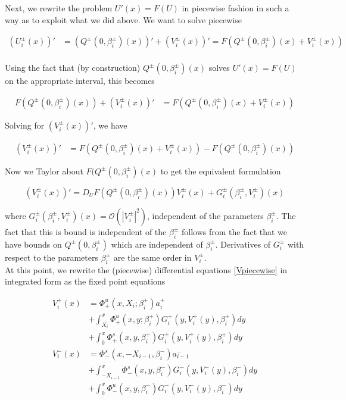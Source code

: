 \documentclass[12pt]{article}
\begin{document}
Next, we rewrite the problem $U'(x) = F(U)$ in piecewise fashion in such a way as to exploit what we did above. We want to solve piecewise

\begin{align*}
(U_i^\pm(x))' &= (Q^\pm(0, \beta_i^\pm)(x))' + (V_i^\pm(x))' = F\left(Q^\pm(0, \beta_i^\pm)(x) + V_i^\pm(x) \right) \\
\end{align*}

Using the fact that (by construction) $Q^\pm(0, \beta_i^\pm)(x)$ solves $U'(x) = F(U)$ on the appropriate interval, this becomes

\begin{align*}
F(Q^\pm(0, \beta_i^\pm)(x)) + (V_i^\pm(x))' &= F(Q^\pm(0, \beta_i^\pm)(x) + V_i^\pm(x) )
\end{align*}

Solving for $(V_i^\pm(x))'$, we have

\begin{align*}
(V_i^\pm(x))' &= F(Q^\pm(0, \beta_i^\pm)(x) + V_i^\pm(x) ) - F(Q^\pm(0, \beta_i^\pm)(x) )
\end{align*}

Now we Taylor about $F(Q^\pm(0, \beta_i^\pm)(x)$ to get the equivalent formulation

\begin{equation}\label{Vpiecewise}
(V_i^\pm(x))' = D_U F(Q^\pm(0, \beta_i^\pm)(x)) V_i^\pm(x)  + G_i^\pm(\beta_i^\pm, V_i^\pm)(x)
\end{equation}

where $G_i^\pm(\beta_i^\pm, V_i^\pm)(x) = \mathcal{O}(|V_i^\pm|^2)$, independent of the parameters $\beta_i^\pm$. The fact that this is bound is independent of the $\beta_i^\pm$ follows from the fact that we have bounds on $Q^\pm(0, \beta_i^\pm)$ which are independent of $\beta_i^\pm$. Derivatives of $G_i^\pm$ with respect to the parameters $\beta_i^\pm$ are the same order in $V_i^\pm$.\\

At this point, we rewrite the (piecewise) differential equations \eqref{Vpiecewise} in integrated form as the fixed point equations

\begin{align*}
V_i^+(x) &= \Phi^u_+(x, X_i; \beta_i^+) a_i^+  \\
&+ \int_{X_i}^x \Phi_+^u(x, y; \beta_i^+) G_i^+(y, V_i^+(y),\beta_i^+)dy \\
&+ \int_0^x \Phi_+^s(x, y, \beta_i^+) G_i^+(y, V_i^+(y),\beta_i^+)dy \\ 
V_i^-(x) &= \Phi^s_-(x, -X_{i-1}, \beta_i^-) a_{i-1}^-  \\
&+ \int_{-X_{i-1}}^x \Phi_-^s(x, y, \beta_i^-) G_i^-(y, V_i^-(y),\beta_i^-)dy \\
&+ \int_0^x \Phi_-^u(x, y, \beta_i^-) G_i^-(y, V_i^-(y),\beta_i^-)dy \\
\end{align*}
\end{document}
